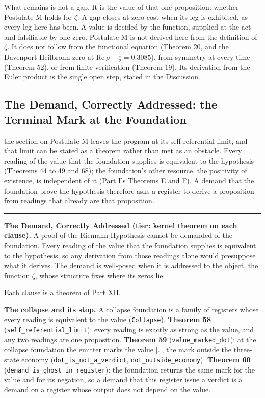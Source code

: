 \documentclass[10pt]{article}
\newcommand{\jboxstart}{\begin{jbox}}
\newcommand{\jboxend}{\end{jbox}}
\newenvironment{jbox}{\par\vspace{2pt}\noindent\color{accent}\rule{\columnwidth}{0.8pt}\par\vspace{-2pt}\small}{\par\vspace{2pt}}
\begin{document}
What remains is not a gap. It is the value of that one proposition:
whether Postulate M holds for \(\zeta\). A gap closes at zero cost when
its leg is exhibited, as every leg here has been. A value is decided by
the function, supplied at the act and falsifiable by one zero. Postulate
M is not derived here from the definition of \(\zeta\). It does not
follow from the functional equation (Theorem 20, and the
Davenport-Heilbronn zero at \(\mathrm{Re}\,\rho - \tfrac12 = 0.3085\)),
from symmetry at every time (Theorem 52), or from finite verification
(Theorem 19). Its derivation from the Euler product is the single open
step, stated in the Discussion.

\hypertarget{the-demand-correctly-addressed-the-terminal-mark-at-the-foundation}{%
\subsection{The Demand, Correctly Addressed: the Terminal Mark at the
Foundation}\label{the-demand-correctly-addressed-the-terminal-mark-at-the-foundation}}

the section on Postulate M leaves the program at its self-referential
limit, and that limit can be stated as a theorem rather than met as an
obstacle. Every reading of the value that the foundation supplies is
equivalent to the hypothesis (Theorems 44 to 49 and 68); the
foundation's other resource, the positivity of existence, is independent
of it (Part I's Theorems E and F). A demand that the foundation prove
the hypothesis therefore asks a register to derive a proposition from
readings that already are that proposition.

\jboxstart

\textbf{The Demand, Correctly Addressed (tier: kernel theorem on each
clause).} A proof of the Riemann Hypothesis cannot be demanded of the
foundation. Every reading of the value that the foundation supplies is
equivalent to the hypothesis, so any derivation from those readings
alone would presuppose what it derives. The demand is well-posed when it
is addressed to the object, the function \(\zeta\), whose structure
fixes where its zeros lie.

\jboxend

Each clause is a theorem of Part XII.

\textbf{The collapse and its stop.} A collapse foundation is a family of
registers whose every reading is equivalent to the value
(\texttt{Collapse}). \textbf{Theorem 58}
(\texttt{self\_referential\_limit}): every reading is exactly as strong
as the value, and any two readings are one proposition. \textbf{Theorem
59} (\texttt{value\_marked\_dot}): at the collapse foundation the
emitter marks the value {[}.{]}, the mark outside the three-state
economy (\texttt{dot\_is\_not\_a\_verdict},
\texttt{dot\_outside\_economy}). \textbf{Theorem 60}
(\texttt{demand\_is\_ghost\_in\_register}): the foundation returns the
same mark for the value and for its negation, so a demand that this
register issue a verdict is a demand on a register whose output does not
depend on the value.
\end{document}
